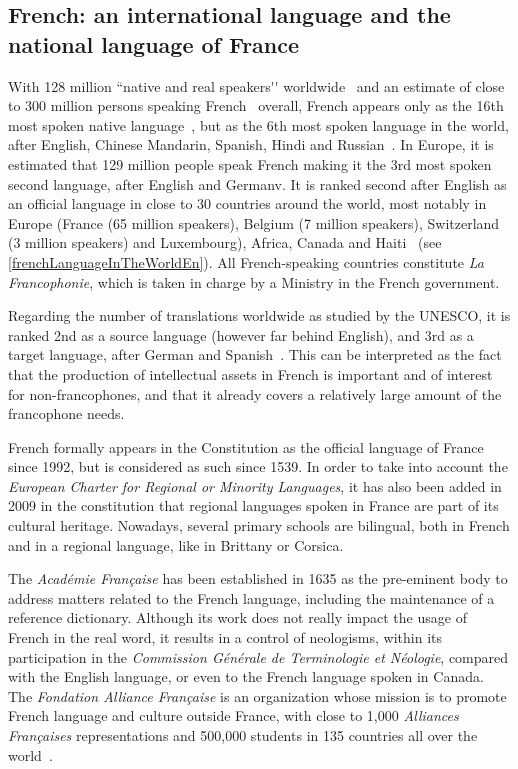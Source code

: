 \documentclass[]{../metanetpaper}
\begin{document}
\begin{multicols}{2}

\subsection{French: an international language and the national language of France}
With 128 million ``native and real speakers{\mbox '}{\mbox '} worldwide~\cite{native} and an estimate
of close to 300 million persons speaking French~\cite{francais} overall, French
appears only as the 16th most spoken native language~\cite{Lewis2009}, but as the
6th most spoken language in the world, after English, Chinese
Mandarin, Spanish, Hindi and Russian~\cite{russe}. In Europe, it is estimated
that 129 million people speak French making it the 3rd most spoken
second language, after English and Germanv. It is ranked second after
English as an official language in close to 30 countries around the
world, most notably in Europe (France (65 million speakers), Belgium
(7 million speakers), Switzerland (3 million speakers) and
Luxembourg), Africa, Canada and Haiti~\cite{haiti} (see \ref{frenchLanguageInTheWorldEn}). All
French-speaking countries constitute {\em La Francophonie}, which is taken
in charge by a Ministry in the French government.

Regarding the number of translations worldwide as studied by the
UNESCO, it is ranked 2nd as a source language (however far behind
English), and 3rd as a target language, after German and
Spanish~\cite{espagnol}. This can be interpreted as the fact that the production of
intellectual assets in French is important and of interest for
non-francophones, and that it already covers a relatively large amount
of the francophone needs.

French formally appears in the Constitution as the official language
of France since 1992, but is considered as such since 1539. In order
to take into account the {\em European Charter for Regional or Minority
Languages}, it has also been added in 2009 in the constitution that
regional languages spoken in France are part of its cultural
heritage. Nowadays, several primary schools are bilingual, both in
French and in a regional language, like in Brittany or Corsica.

The {\em Académie Française} has been established in 1635 as the pre-eminent
body to address matters related to the French language, including the
maintenance of a reference dictionary. Although its work does not
really impact the usage of French in the real word, it results in a
control of neologisms, within its participation in the {\em Commission
Générale de Terminologie et Néologie}, compared with the English
language, or even to the French language spoken in Canada. The
{\em Fondation Alliance Française} is an organization whose mission is to
promote French language and culture outside France, with close to
1,000 {\em Alliances Françaises} representations and 500,000 students in 135
countries all over the world~\cite{monde}.


\end{multicols}
\end{document}
